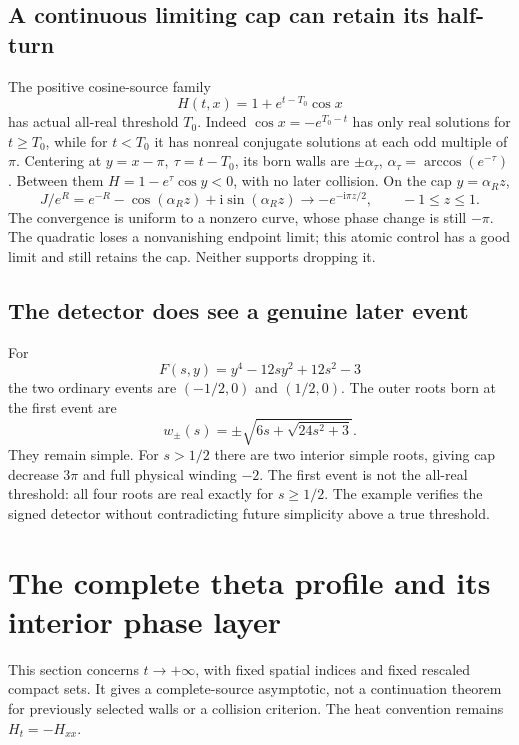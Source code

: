\documentclass[11pt]{article}
\theoremstyle{definition}
\newcommand{\ii}{\mathrm i}
\begin{document}
\subsection{A continuous limiting cap can retain its half-turn}
The positive cosine-source family
\[
 H(t,x)=1+e^{t-T_0}\cos x
\]
has actual all-real threshold \(T_0\). Indeed \(\cos x=-e^{T_0-t}\)
has only real solutions for \(t\ge T_0\), while for \(t<T_0\) it has
nonreal conjugate solutions at each odd multiple of \(\pi\).
Centering at \(y=x-\pi,\ \tau=t-T_0\), its born walls are
\(\pm\alpha_\tau\), \(\alpha_\tau=\arccos(e^{-\tau})\).
Between them \(H=1-e^\tau\cos y<0\), with no later collision.
On the cap \(y=\alpha_R z\),
\[
 J/e^R=e^{-R}-\cos(\alpha_R z)+\ii\sin(\alpha_R z)
       \longrightarrow-e^{-\ii\pi z/2},\qquad -1\le z\le1.
\]
The convergence is uniform to a nonzero curve, whose phase change is
still \(-\pi\). The quadratic loses a nonvanishing endpoint limit;
this atomic control has a good limit and still retains the cap.
Neither supports dropping it.

\subsection{The detector does see a genuine later event}
For
\[
 F(s,y)=y^4-12sy^2+12s^2-3
\]
the two ordinary events are \((-1/2,0)\) and \((1/2,0)\).
The outer roots born at the first event are
\[
 w_\pm(s)=\pm\sqrt{6s+\sqrt{24s^2+3}}.
\]
They remain simple. For \(s>1/2\) there are two interior simple roots,
giving cap decrease \(3\pi\) and full physical winding \(-2\).
The first event is not the all-real threshold: all four roots are real
exactly for \(s\ge1/2\). The example verifies the signed detector
without contradicting future simplicity above a true threshold.

\section{The complete theta profile and its interior phase layer}
\label{asym:section}
This section concerns $t\to+\infty$, with fixed spatial indices and
fixed rescaled compact sets.  It gives a complete-source asymptotic,
not a continuation theorem for previously selected walls or a collision
criterion.  The heat convention remains $H_t=-H_{xx}$.
\end{document}
